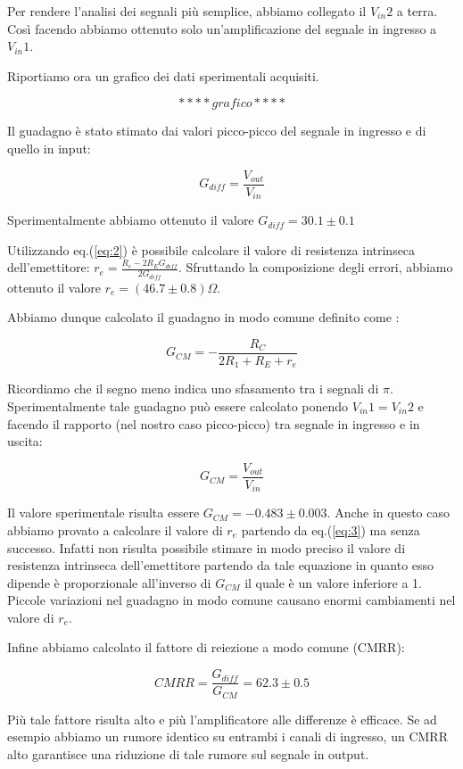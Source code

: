 Per rendere l'analisi dei segnali più semplice, abbiamo collegato il $V_{in}2$ a terra.
Così facendo abbiamo ottenuto solo un'amplificazione del segnale in ingresso a $V_{in}1$. 

Riportiamo ora un grafico dei dati sperimentali acquisiti. 

$$****grafico****$$


Il guadagno è stato stimato dai valori picco-picco del segnale in ingresso e di quello in input:

$$G_{diff}=\frac{V_{out}}{V_{in}}$$

Sperimentalmente abbiamo ottenuto il valore $G_{diff}=30.1 \pm 0.1$


Utilizzando eq.(\ref{eq:2}) è possibile calcolare il valore di resistenza intrinseca dell'emettitore: $r_e=\frac{R_c-2R_E G_{diff}}{2G_{diff}}$.
Sfruttando la composizione degli errori, abbiamo ottenuto il valore $r_e=(46.7\pm0.8)\Omega$.

Abbiamo dunque calcolato il guadagno in modo comune definito come :

\begin{equation}
G_{CM}=-\frac{R_C}{2R_1+R_E+	r_e}
\label{eq:3}
\end{equation}

Ricordiamo che il segno meno indica uno sfasamento tra i segnali di $\pi$.
Sperimentalmente tale guadagno può essere calcolato ponendo $V_{in}1=V_{in}2$ e facendo il rapporto (nel nostro caso picco-picco) tra segnale in ingresso e in uscita:

$$G_{CM}=\frac{V_{out}}{V_{in}}$$

Il valore sperimentale risulta essere $G_{CM}=-0.483\pm0.003$. Anche in questo caso abbiamo provato a calcolare il valore di $r_e$ partendo da eq.(\ref{eq:3}) ma senza successo. Infatti non risulta possibile stimare in modo preciso il valore di resistenza intrinseca dell'emettitore partendo da tale equazione in quanto esso dipende è proporzionale all'inverso di $G_{CM}$ il quale è un valore inferiore a 1. Piccole variazioni nel guadagno in modo comune causano enormi cambiamenti nel valore di $r_e$. 

Infine abbiamo calcolato il fattore di reiezione a modo comune (CMRR):

\begin{equation}
CMRR=\frac{G_{diff}}{G_{CM}}=62.3\pm0.5
\end{equation}

Più tale fattore risulta alto e più l'amplificatore alle differenze è efficace. Se ad esempio abbiamo un rumore identico su entrambi i canali di ingresso, un CMRR alto garantisce una riduzione di tale rumore sul segnale in output.

